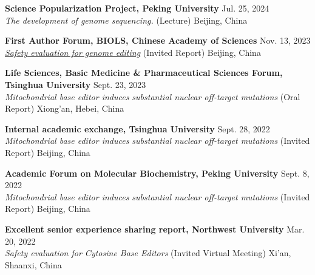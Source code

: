 \textbf{Science Popularization Project, Peking University} \hfill Jul. 25, 2024 \\
{\small \textit{The development of genome sequencing.} (Lecture) \hfill Beijing, China}

\vspace{5pt}

\textbf{First Author Forum, BIOLS, Chinese Academy of Sciences} \hfill Nov. 13, 2023\\
{\small \textit{\href{http://www.biols.cas.cn/xwdt/zhxw/202311/t20231120_6935705.html}{Safety evaluation for genome editing}} (Invited Report) \hfill Beijing, China}

\vspace{5pt}

\textbf{Life Sciences, Basic Medicine \& Pharmaceutical Sciences Forum, Tsinghua University} \hfill Sept. 23, 2023\\
{\small \textit{Mitochondrial base editor induces substantial nuclear off-target mutations} (Oral Report) \hfill Xiong'an, Hebei, China}

\vspace{5pt}

\textbf{Internal academic exchange, Tsinghua University} \hfill Sept. 28, 2022\\
{\small \textit{Mitochondrial base editor induces substantial nuclear off-target mutations} (Invited Report) \hfill Beijing, China}

\vspace{5pt}

\textbf{Academic Forum on Molecular Biochemistry, Peking University} \hfill Sept. 8, 2022\\
{\small \textit{Mitochondrial base editor induces substantial nuclear off-target mutations} (Invited Report) \hfill Beijing, China}

\vspace{5pt}

\textbf{Excellent senior experience sharing report, Northwest University} \hfill Mar. 20, 2022\\
{\small \textit{Safety evaluation for Cytosine Base Editors} (Invited Virtual Meeting) \hfill Xi’an, Shaanxi, China}
